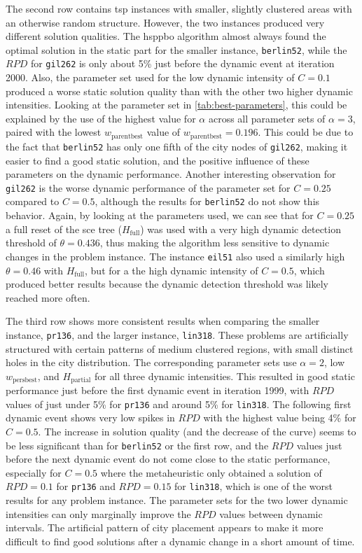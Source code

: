 The second row contains \gls{tsp} instances with smaller, slightly clustered areas with an otherwise random structure. However, the two instances produced very different solution qualities. The \gls{hsppbo} algorithm almost always found the optimal solution in the static part for the smaller instance, \texttt{berlin52}, while the $RPD$ for \texttt{gil262} is only about 5\% just before the dynamic event at iteration 2000. Also, the parameter set used for the low dynamic intensity of $C=0.1$ produced a worse static solution quality than with the other two higher dynamic intensities. Looking at the parameter set in \cref{tab:best-parameters}, this could be explained by the use of the highest value for $\alpha$ across all parameter sets of  $\alpha = 3$, paired with the lowest $w_\text{parentbest}$ value of $w_\text{parentbest} = 0.196$. This could be due to the fact that \texttt{berlin52} has only one fifth of the city nodes of \texttt{gil262}, making it easier to find a good static solution, and the positive influence of these parameters on the dynamic performance. Another interesting observation for \texttt{gil262} is the worse dynamic performance of the parameter set for $C=0.25$ compared to $C=0.5$, although the results for \texttt{berlin52} do not show this behavior. Again, by looking at the parameters used, we can see that for $C=0.25$ a full reset of the \gls{sce} tree ($H_\text{full}$) was used with a very high dynamic detection threshold of $\theta=0.436$, thus making the algorithm less sensitive to dynamic changes in the problem instance. The instance \texttt{eil51} also used a similarly high $\theta = 0.46$ with $H_\text{full}$, but for a the high dynamic intensity of $C=0.5$, which produced better results because the dynamic detection threshold was likely reached more often.

The third row shows more consistent results when comparing the smaller instance, \texttt{pr136}, and the larger instance, \texttt{lin318}. These problems are artificially structured with certain patterns of medium clustered regions, with small distinct holes in the city distribution. The corresponding parameter sets use $\alpha = 2$, low $w_\text{persbest}$, and $H_\text{partial}$ for all three dynamic intensities. This resulted in good static performance just before the first dynamic event in iteration 1999, with $RPD$ values of just under 5\% for \texttt{pr136} and around 5\% for \texttt{lin318}.  The following first dynamic event shows very low spikes in $RPD$ with the highest value being 4\% for $C=0.5$. The increase in solution quality (and the decrease of the curve) seems to be less significant than for \texttt{berlin52} or the first row, and the $RPD$ values just before the next dynamic event do not come close to the static performance, especially for $C=0.5$ where the metaheuristic only obtained a solution of $RPD=0.1$ for \texttt{pr136} and $RPD=0.15$ for \texttt{lin318}, which is one of the worst results for any problem instance. The parameter sets for the two lower dynamic intensities can only marginally improve the $RPD$ values between dynamic intervals. The artificial pattern of city placement appears to make it more difficult to find good solutions after a dynamic change in a short amount of time.

